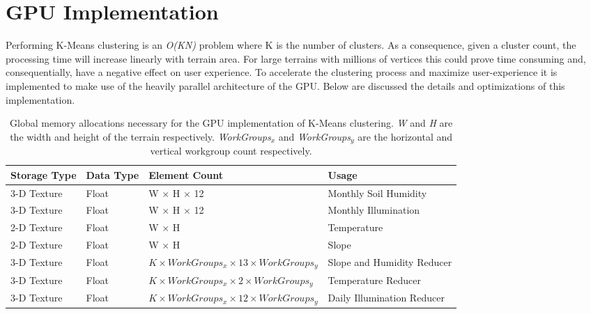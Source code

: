 \section{GPU Implementation} \label{sec:gpu_clustering}

Performing K-Means clustering is an \textit{O(KN)} problem where K is the number of clusters. As a consequence, given a cluster count, the processing time will increase linearly with terrain area. For large terrains with millions of vertices this could prove time consuming and, consequentially, have a negative effect on user experience. To accelerate the clustering process and maximize user-experience it is implemented to make use of the heavily parallel architecture of the GPU. Below are discussed the details and optimizations of this implementation. \\

\begin{table}[]
  \centering
	    \begin{tabular}{|p{3cm}|p{1.5cm}|p{6cm}|p{5cm}|}
		\hline	
  	    \textbf{Storage Type} &  \textbf{Data Type} & \textbf{Element Count} & \textbf{Usage} \\
		\hline
		3-D Texture & Float & W $\times$ H $\times$ 12 & Monthly Soil Humidity \\
		\hline
		3-D Texture & Float & W $\times$ H $\times$ 12 & Monthly Illumination \\
		\hline
		2-D Texture & Float & W $\times$ H & Temperature \\
		\hline
		2-D Texture & Float & W $\times$ H & Slope \\
		\hline
		3-D Texture & Float & $ \textit{K} \times WorkGroups_{x} \times 13 \times WorkGroups_{y} $ &  Slope and Humidity Reducer \\
		\hline
		3-D Texture & Float & $ \textit{K} \times WorkGroups_{x} \times 2 \times WorkGroups_{y} $ &  Temperature Reducer \\
		\hline
		3-D Texture & Float & $ \textit{K} \times WorkGroups_{x} \times 12 \times WorkGroups_{y} $ & Daily Illumination Reducer \\
		\hline
		\end{tabular}
		\caption{Global memory allocations necessary for the GPU implementation of K-Means clustering. \textit{W} and \textit{H} are the width and height of the terrain respectively. \textit{WorkGroups$_{x}$} and \textit{WorkGroups$_{y}$} are the horizontal and vertical workgroup count respectively.}
	  \label{tab:clustering_mem_allocs}
\end{table}

